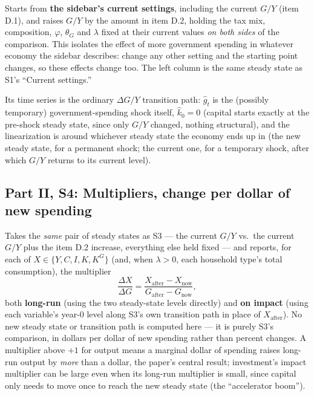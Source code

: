 \documentclass[11pt]{article}
\newcommand{\eq}[1]{\begin{equation}#1\end{equation}}
\begin{document}
Starts from \textbf{the sidebar's current settings}, including the current
$G/Y$ (item D.1), and raises $G/Y$ by the amount in item D.2, holding the
tax mix, composition, $\varphi$, $\theta_G$ and $\lambda$ fixed at their
current values \emph{on both sides} of the comparison. This isolates the
effect of more government spending in whatever economy the sidebar
describes: change any other setting and the starting point changes, so
these effects change too. The left column is the same steady state as
S1's ``Current settings.''

Its time series is the ordinary $\Delta G/Y$ transition path: $\hat g_t$ is
the (possibly temporary) government-spending shock itself, $\hat k_0=0$
(capital starts exactly at the pre-shock steady state, since only $G/Y$
changed, nothing structural), and the linearization is around whichever
steady state the economy ends up in (the new steady state, for a permanent
shock; the current one, for a temporary shock, after which $G/Y$ returns
to its current level).

\subsection{Part II, S4: Multipliers, change per dollar of new spending}

Takes the \emph{same} pair of steady states as S3 --- the current $G/Y$
vs.\ the current $G/Y$ plus the item D.2 increase, everything else held
fixed --- and reports, for each of $X\in\{Y,C,I,K,K^G\}$ (and, when
$\lambda>0$, each household type's total consumption), the multiplier
\eq{ \frac{\Delta X}{\Delta G} = \frac{X_{\text{after}}-X_{\text{now}}}{G_{\text{after}}-G_{\text{now}}}, }
both \textbf{long-run} (using the two steady-state levels directly) and
\textbf{on impact} (using each variable's year-0 level along S3's own
transition path in place of $X_{\text{after}}$). No new steady state or
transition path is computed here --- it is purely S3's comparison, in
dollars per dollar of new spending rather than percent changes. A
multiplier above $+1$ for output means a marginal dollar of spending
raises long-run output by \emph{more} than a dollar, the paper's central
result; investment's impact multiplier can be large even when its long-run
multiplier is small, since capital only needs to move once to reach the
new steady state (the ``accelerator boom'').
\end{document}
